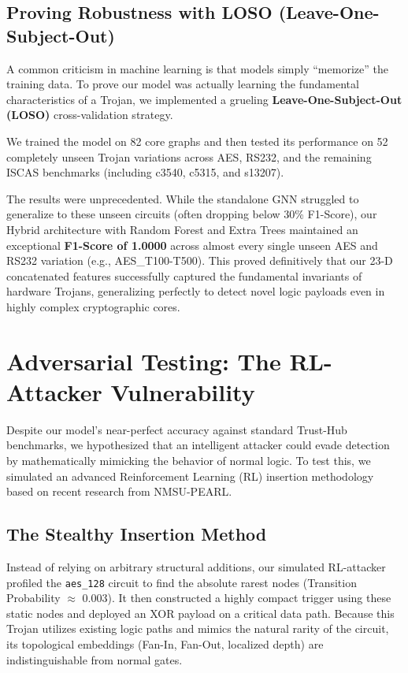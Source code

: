 \documentclass[12pt]{article}
\begin{document}
\subsection{Proving Robustness with LOSO (Leave-One-Subject-Out)}
A common criticism in machine learning is that models simply ``memorize'' the training data. To prove our model was actually learning the fundamental characteristics of a Trojan, we implemented a grueling \textbf{Leave-One-Subject-Out (LOSO)} cross-validation strategy. 

We trained the model on 82 core graphs and then tested its performance on 52 completely unseen Trojan variations across AES, RS232, and the remaining ISCAS benchmarks (including c3540, c5315, and s13207). 

The results were unprecedented. While the standalone GNN struggled to generalize to these unseen circuits (often dropping below 30\% F1-Score), our Hybrid architecture with Random Forest and Extra Trees maintained an exceptional \textbf{F1-Score of 1.0000} across almost every single unseen AES and RS232 variation (e.g., AES\_T100-T500). This proved definitively that our 23-D concatenated features successfully captured the fundamental invariants of hardware Trojans, generalizing perfectly to detect novel logic payloads even in highly complex cryptographic cores.

\section{Adversarial Testing: The RL-Attacker Vulnerability}
Despite our model's near-perfect accuracy against standard Trust-Hub benchmarks, we hypothesized that an intelligent attacker could evade detection by mathematically mimicking the behavior of normal logic. To test this, we simulated an advanced Reinforcement Learning (RL) insertion methodology based on recent research from NMSU-PEARL. 

\subsection{The Stealthy Insertion Method}
Instead of relying on arbitrary structural additions, our simulated RL-attacker profiled the \texttt{aes\_128} circuit to find the absolute rarest nodes (Transition Probability $\approx$ 0.003). It then constructed a highly compact trigger using these static nodes and deployed an XOR payload on a critical data path. Because this Trojan utilizes existing logic paths and mimics the natural rarity of the circuit, its topological embeddings (Fan-In, Fan-Out, localized depth) are indistinguishable from normal gates.
\end{document}
